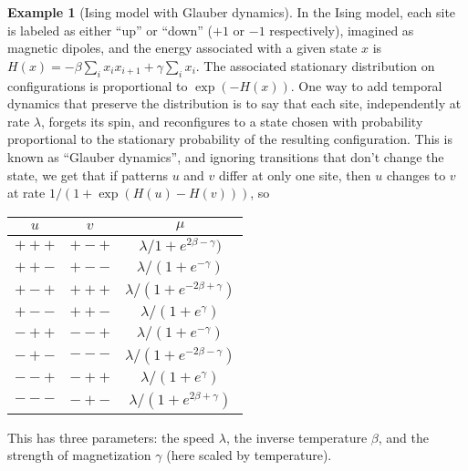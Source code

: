 \documentclass{article}
\theoremstyle{definition}
\newtheorem{example}{Example}[section]
\begin{document}
\begin{example}[Ising model with Glauber dynamics]
  In the Ising model, each site is labeled as either ``up'' or ``down'' ($+1$ or $-1$ respectively),
  imagined as magnetic dipoles,
  and the energy associated with a given state $x$ is $H(x) = - \beta \sum_i x_i x_{i+1} + \gamma \sum_i x_i$.
  The associated stationary distribution on configurations is proportional to $\exp(-H(x))$.
  One way to add temporal dynamics that preserve the distribution 
  is to say that each site, independently at rate $\lambda$,
  forgets its spin, 
  and reconfigures to a state chosen with probability proportional to the stationary probability of the resulting configuration.
  This is known as ``Glauber dynamics'', and ignoring transitions that don't change the state,
  we get that if patterns $u$ and $v$ differ at only one site, then $u$ changes to $v$ at rate $1/(1+\exp(H(u)-H(v)))$, so

  \begin{center}
    \begin{tabular}{c@{\quad$\to$\quad}c@{\quad at rate\quad }c}
      $u$  &  $v$  &  $\mu$  \\
      \hline
      $+++$  &   $+-+$   &  $\lambda/1+e^{2\beta - \gamma})$ \\
      $++-$  &   $+--$   &  $\lambda/(1+e^{-\gamma})$ \\
      $+-+$  &   $+++$   &  $\lambda/(1+e^{-2\beta + \gamma})$ \\
      $+--$  &   $++-$   &  $\lambda/(1+e^{\gamma})$ \\
      $-++$  &   $--+$   &  $\lambda/(1+e^{-\gamma})$ \\
      $-+-$  &   $---$   &  $\lambda/(1+e^{-2\beta - \gamma})$ \\
      $--+$  &   $-++$   &  $\lambda/(1+e^{\gamma})$ \\
      $---$  &   $-+-$   &  $\lambda/(1+e^{2\beta + \gamma})$ 
    \end{tabular}
  \end{center}

  This has three parameters: the speed $\lambda$, the inverse temperature $\beta$, and the strength of magnetization $\gamma$
  (here scaled by temperature).

\end{example}
\end{document}
